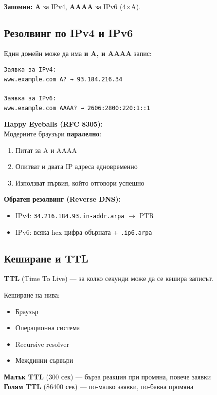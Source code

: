 \documentclass[12pt,a4paper]{article}
\begin{document}
\textbf{Запомни:} \textbf{A} за IPv4, \textbf{AAAA} за IPv6 (4×A).

\subsection{Резолвинг по IPv4 и IPv6}

Един домейн може да има \textbf{и A, и AAAA} запис:

\begin{lstlisting}
Заявка за IPv4:
www.example.com A? → 93.184.216.34

Заявка за IPv6:
www.example.com AAAA? → 2606:2800:220:1::1
\end{lstlisting}

\textbf{Happy Eyeballs (RFC 8305):}\\
Модерните браузъри \textbf{паралелно}:
\begin{enumerate}
    \item Питат за A и AAAA
    \item Опитват и двата IP адреса едновременно
    \item Използват първия, който отговори успешно
\end{enumerate}

\textbf{Обратен резолвинг (Reverse DNS):}
\begin{itemize}
    \item IPv4: \texttt{34.216.184.93.in-addr.arpa} $\rightarrow$ PTR
    \item IPv6: всяка hex цифра обърната + \texttt{.ip6.arpa}
\end{itemize}

\subsection{Кеширане и TTL}

\textbf{TTL} (Time To Live) — за колко секунди може да се кешира записът.

Кеширане на нива:
\begin{itemize}
    \item Браузър
    \item Операционна система
    \item Recursive resolver
    \item Междинни сървъри
\end{itemize}

\textbf{Малък TTL} (300 сек) — бърза реакция при промяна, повече заявки\\
\textbf{Голям TTL} (86400 сек) — по-малко заявки, по-бавна промяна
\end{document}
